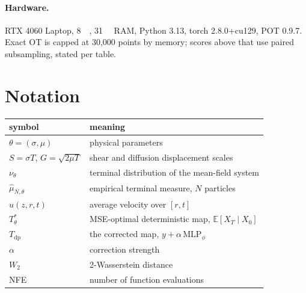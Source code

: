 ﻿\documentclass[11pt,a4paper]{article}
\newcommand{\Wtwo}{W_2}
\begin{document}
\paragraph{Hardware.} RTX 4060 Laptop, \SI{8}{\giga\byte}, \SI{31}{\giga\byte} RAM,
Python 3.13, torch 2.8.0+cu129, POT 0.9.7. Exact OT is capped at 30{,}000 points by memory;
scores above that use paired subsampling, stated per table.

\section{Notation}

\begin{table}[h]
\centering\small
\begin{tabular}{@{}ll@{}}
\toprule
symbol & meaning \\
\midrule
$\theta=(\sigma,\mu)$ & physical parameters \\
$S=\sigma T$, $G=\sqrt{2\mu T}$ & shear and diffusion displacement scales \\
$\nu_\theta$ & terminal distribution of the mean-field system \\
$\hat\mu_{N,\theta}$ & empirical terminal measure, $N$ particles \\
$u(z,r,t)$ & average velocity over $[r,t]$ \\
$T^*_\theta$ & MSE-optimal deterministic map, $\mathbb{E}[X_T\mid X_0]$ \\
$T_{\text{dp}}$ & the corrected map, $y+\alpha\,\mathrm{MLP}_\phi$ \\
$\alpha$ & correction strength \\
$\Wtwo$ & 2-Wasserstein distance \\
NFE & number of function evaluations \\
\bottomrule
\end{tabular}
\end{table}
\end{document}
